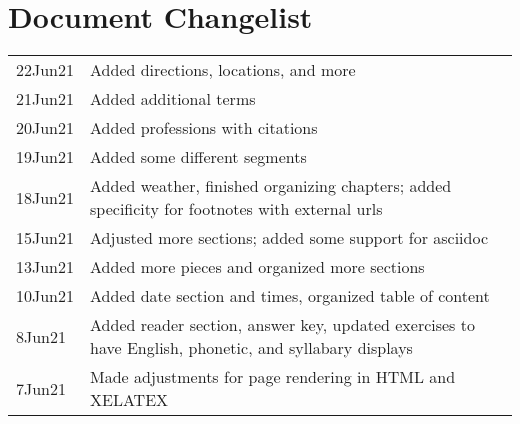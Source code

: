 \chapter{Document Changelist}
\begin{tabular}{p{3cm} p{11cm}}
22Jun21 & Added directions, locations, and more \\
21Jun21 & Added additional terms \\
20Jun21 & Added professions with citations\\
19Jun21 & Added some different segments \\
18Jun21 & Added weather, finished organizing chapters; added specificity for footnotes with external urls\\
15Jun21 & Adjusted more sections; added some support for asciidoc\\
13Jun21 & Added more pieces and organized more sections \\
10Jun21 & Added date section and times, organized table of content\\
8Jun21 & Added reader section, answer key, updated exercises to have English, phonetic, and syllabary displays \\
7Jun21 & Made adjustments for page rendering in HTML and XELATEX
\end{tabular}